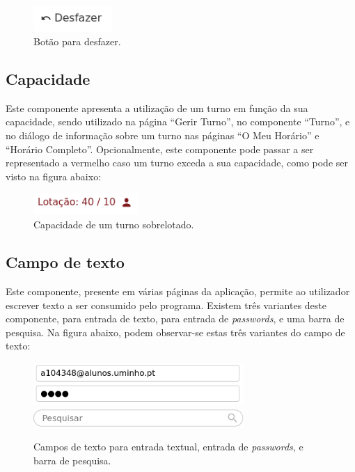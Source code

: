 \documentclass[12pt, a4paper]{article}
\begin{document}
\begin{figure}[H]
    \centering
    \includegraphics[width=3cm]{res/components/undo-button.png}
    \caption{Botão para desfazer.}
    \label{undo-button}
\end{figure}

\subsection{Capacidade}

Este componente apresenta a utilização de um turno em função da sua capacidade, sendo utilizado na
página ``Gerir Turno'', no componente ``Turno'', e no diálogo de informação sobre um turno nas
páginas ``O Meu Horário'' e ``Horário Completo''. Opcionalmente, este componente pode passar a ser
representado a vermelho caso um turno exceda a sua capacidade, como pode ser visto na figura abaixo:

\begin{figure}[H]
    \centering
    \includegraphics[width=4cm]{res/components/capacity.png}
    \caption{Capacidade de um turno sobrelotado.}
    \label{capacity}
\end{figure}

\subsection{Campo de texto}

Este componente, presente em várias páginas da aplicação, permite ao utilizador escrever texto a ser
consumido pelo programa. Existem três variantes deste componente, para entrada de texto, para
entrada de \emph{passwords}, e uma barra de pesquisa. Na figura abaixo, podem observar-se estas três
variantes do campo de texto:

\begin{figure}[H]
    \centering
    \includegraphics[width=8cm]{res/components/text-input-regular-password.png} \\
    \includegraphics[width=8cm]{res/components/text-input-search.png}
    \caption{
        Campos de texto para entrada textual, entrada de \emph{passwords}, e barra de pesquisa.
    }
    \label{text-input}
\end{figure}
\end{document}
